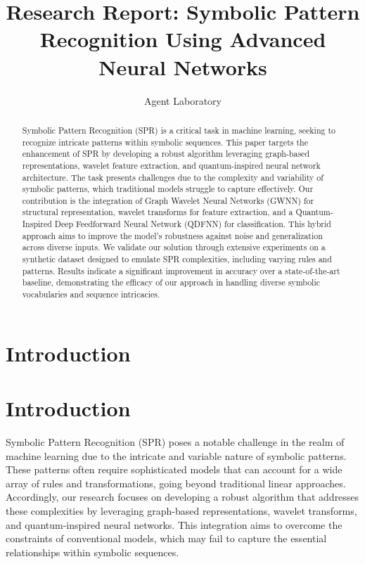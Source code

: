 \documentclass{article}
\title{Research Report: Symbolic Pattern Recognition Using Advanced Neural Networks}
\author{Agent Laboratory}
\begin{document}
\maketitle

\begin{abstract}
Symbolic Pattern Recognition (SPR) is a critical task in machine learning, seeking to recognize intricate patterns within symbolic sequences. This paper targets the enhancement of SPR by developing a robust algorithm leveraging graph-based representations, wavelet feature extraction, and quantum-inspired neural network architecture. The task presents challenges due to the complexity and variability of symbolic patterns, which traditional models struggle to capture effectively. Our contribution is the integration of Graph Wavelet Neural Networks (GWNN) for structural representation, wavelet transforms for feature extraction, and a Quantum-Inspired Deep Feedforward Neural Network (QDFNN) for classification. This hybrid approach aims to improve the model's robustness against noise and generalization across diverse inputs. We validate our solution through extensive experiments on a synthetic dataset designed to emulate SPR complexities, including varying rules and patterns. Results indicate a significant improvement in accuracy over a state-of-the-art baseline, demonstrating the efficacy of our approach in handling diverse symbolic vocabularies and sequence intricacies.
\end{abstract}

\section{Introduction}

\section{Introduction}

Symbolic Pattern Recognition (SPR) poses a notable challenge in the realm of machine learning due to the intricate and variable nature of symbolic patterns. These patterns often require sophisticated models that can account for a wide array of rules and transformations, going beyond traditional linear approaches. Accordingly, our research focuses on developing a robust algorithm that addresses these complexities by leveraging graph-based representations, wavelet transforms, and quantum-inspired neural networks. This integration aims to overcome the constraints of conventional models, which may fail to capture the essential relationships within symbolic sequences.
\end{document}
